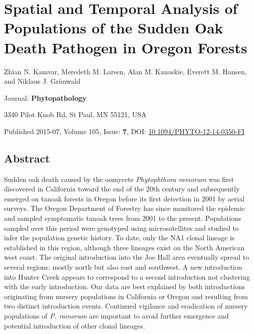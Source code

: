 \documentclass[double,11pt]{beavtex}
\begin{document}
  \chapter{Spatial and Temporal Analysis of Populations of the Sudden Oak
  Death Pathogen in Oregon
  Forests}\label{spatial-and-temporal-analysis-of-populations-of-the-sudden-oak-death-pathogen-in-oregon-forests}
  
  \singlespacing
  
  \begin{center}
  Zhian N. Kamvar, Meredeth M. Larsen, Alan M. Kanaskie, Everett M.
  Hansen, and Niklaus J. Grünwald
  
  
  
  \end{center}\vspace*{\fill}
  
  Journal: \textbf{Phytopathology}
  
  3340 Pilot Knob Rd, St Paul, MN 55121, USA
  
  Published 2015-07, Volume 105, Issue: \textbf{7}, DOI:
  \href{http://dx.doi.org/10.1094/PHYTO-12-14-0350-FI}{10.1094/PHYTO-12-14-0350-FI}
  
  \doublespacing
  \newpage
  
  \section{Abstract}\label{abstract-2}
  
  Sudden oak death caused by the oomycete \emph{Phytophthora ramorum} was
  first discovered in California toward the end of the 20th century and
  subsequently emerged on tanoak forests in Oregon before its first
  detection in 2001 by aerial surveys. The Oregon Department of Forestry
  has since monitored the epidemic and sampled symptomatic tanoak trees
  from 2001 to the present. Populations sampled over this period were
  genotyped using microsatellites and studied to infer the population
  genetic history. To date, only the NA1 clonal lineage is established in
  this region, although three lineages exist on the North American west
  coast. The original introduction into the Joe Hall area eventually
  spread to several regions: mostly north but also east and southwest. A
  new introduction into Hunter Creek appears to correspond to a second
  introduction not clustering with the early introduction. Our data are
  best explained by both introductions originating from nursery
  populations in California or Oregon and resulting from two distinct
  introduction events. Continued vigilance and eradication of nursery
  populations of \emph{P. ramorum} are important to avoid further
  emergence and potential introduction of other clonal lineages.
  
\end{document}
